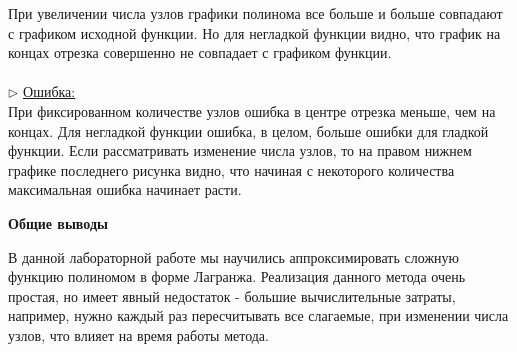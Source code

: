 \documentclass{article}
\begin{document}
	При увеличении числа узлов графики полинома все больше и больше совпадают с графиком исходной функции. Но для негладкой функции видно, что график на концах отрезка совершенно не совпадает с графиком функции.\\
	\\
	$\triangleright$ \underline{Ошибка:}\\
	При фиксированном количестве узлов ошибка в центре отрезка меньше, чем на концах. Для негладкой функции ошибка, в целом, больше ошибки для гладкой функции. Если рассматривать изменение числа узлов, то на правом нижнем графике последнего рисунка видно, что начиная с некоторого количества максимальная ошибка начинает расти.
	\begin{center} \textbf{Общие выводы}\end{center}
	В данной лабораторной работе мы научились аппроксимировать сложную функцию полиномом в форме Лагранжа. Реализация данного метода очень простая, но имеет явный недостаток - большие вычислительные затраты, например, нужно каждый раз пересчитывать все слагаемые, при изменении числа узлов, что влияет на время работы метода.
\end{document}
